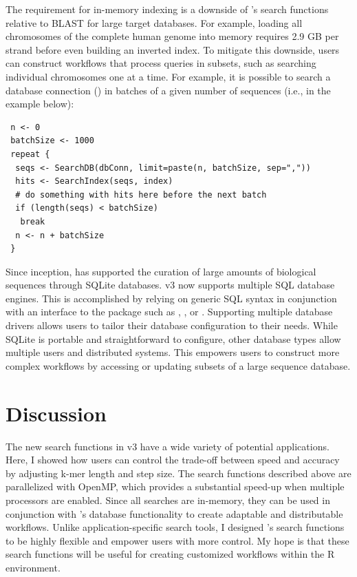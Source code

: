 The requirement for in-memory indexing is a downside of 's search functions relative to BLAST for large target databases. For example, loading all chromosomes of the complete human genome into memory requires 2.9 GB per strand before even building an inverted index. To mitigate this downside, users can construct workflows that process queries in subsets, such as searching individual chromosomes one at a time. For example, it is possible to search a database connection () in batches of a given number of sequences (i.e.,  in the example below):

\begin{verbatim}
 n <- 0
 batchSize <- 1000
 repeat {
  seqs <- SearchDB(dbConn, limit=paste(n, batchSize, sep=","))
  hits <- SearchIndex(seqs, index)
  # do something with hits here before the next batch
  if (length(seqs) < batchSize)
   break
  n <- n + batchSize
 }
\end{verbatim}

Since inception,  has supported the curation of large amounts of biological sequences through SQLite databases.  v3 now supports multiple SQL database engines. This is accomplished by relying on generic SQL syntax in conjunction with an interface to the  package such as , , or . Supporting multiple database drivers allows users to tailor their database configuration to their needs. While SQLite is portable and straightforward to configure, other database types allow multiple users and distributed systems. This empowers users to construct more complex workflows by accessing or updating subsets of a large sequence database.

\section{Discussion}\label{discussion}

The new search functions in  v3 have a wide variety of potential applications. Here, I showed how users can control the trade-off between speed and accuracy by adjusting k-mer length and step size. The search functions described above are parallelized with OpenMP, which provides a substantial speed-up when multiple processors are enabled. Since all searches are in-memory, they can be used in conjunction with 's database functionality to create adaptable and distributable workflows. Unlike application-specific search tools, I designed 's search functions to be highly flexible and empower users with more control. My hope is that these search functions will be useful for creating customized workflows within the R environment.

